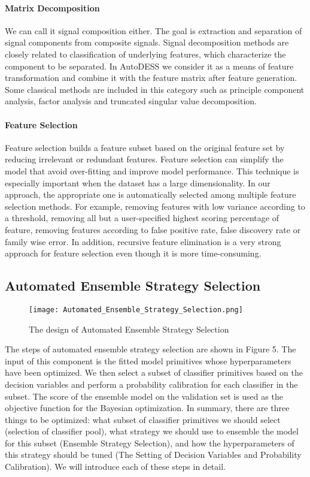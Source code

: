 \documentclass[review]{elsarticle}
\begin{document}
\paragraph{Matrix Decomposition}
We can call it signal composition either. The goal is extraction and separation of signal components from composite signals. Signal decomposition methods are closely related to classification of underlying features, which characterize the component to be separated\cite{Ohm2004}. In AutoDESS we consider it as a means of feature transformation and combine it with the feature matrix after feature generation. Some classical methods are included in this category such as principle component analysis, factor analysis and truncated singular value decomposition.
\paragraph{Feature Selection}
Feature selection builds a feature subset based on the original feature set by reducing irrelevant or redundant features. Feature selection can simplify the model that avoid over-fitting and improve model performance. This technique is especially important when the dataset has a large dimensionality. In our approach, the appropriate one is automatically selected among multiple feature selection methods. For example, removing features with low variance according to a threshold, removing all but a user-specified highest scoring percentage of feature, removing features according to false positive rate, false discovery rate or family wise error. In addition, recursive feature elimination is a very strong approach for feature selection even though it is more time-consuming.


\subsection{Automated Ensemble Strategy Selection}
\begin{figure}[htbp]
	\centering
	\texttt{[image: Automated\_Ensemble\_Strategy\_Selection.png]}
	\caption{The design of Automated Ensemble Strategy Selection}
\end{figure}
The steps of automated ensemble strategy selection are shown in Figure 5. The input of this component is the fitted model primitives whose hyperparameters have been optimized. We then select a subset of classifier primitives based on the decision variables and perform a probability calibration for each classifier in the subset. The score of the ensemble model on the validation set is used as the objective function for the Bayesian optimization. In summary, there are three things to be optimized: what subset of classifier primitives we should select (selection of classifier pool), what strategy we should use to ensemble the model for this subset (Ensemble Strategy Selection), and how the hyperparameters of this strategy should be tuned (The Setting of Decision Variables and Probability Calibration). We will introduce each of these steps in detail.
\end{document}
